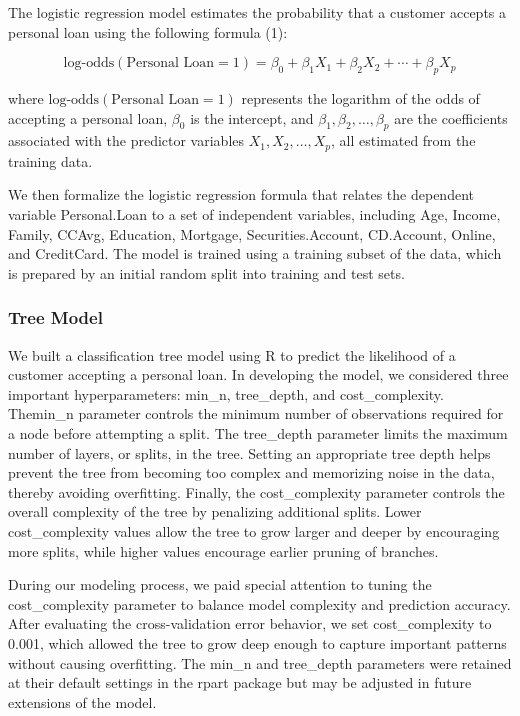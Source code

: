 \documentclass[12pt]{article}
\begin{document}
The logistic regression model estimates the probability that a customer accepts a personal loan using the following formula (1):

\begin{equation}
\text{log-odds}(\text{Personal Loan} = 1) = \beta_0 + \beta_1 X_1 + \beta_2 X_2 + \cdots + \beta_p X_p
\end{equation}

where $\text{log-odds}(\text{Personal Loan} = 1)$ represents the logarithm of the odds of accepting a personal loan, $\beta_0$ is the intercept, and $\beta_1, \beta_2, \dots, \beta_p$ are the coefficients associated with the predictor variables $X_1, X_2, \dots, X_p$, all estimated from the training data.

We then formalize the logistic regression formula that relates the dependent variable Personal.Loan to a set of independent variables, including Age, Income, Family, CCAvg, Education, Mortgage, Securities.Account, CD.Account, Online, and CreditCard. The model is trained using a training subset of the data, which is prepared by an initial random split into training and test sets.

\subsubsection{Tree Model}
We built a classification tree model using \textsf{R} to predict the likelihood of a customer accepting a personal loan. In developing the model, we considered three important hyperparameters: min\_n, tree\_depth, and cost\_complexity. Themin\_n parameter controls the minimum number of observations required for a node before attempting a split. The tree\_depth parameter limits the maximum number of layers, or splits, in the tree. Setting an appropriate tree depth helps prevent the tree from becoming too complex and memorizing noise in the data, thereby avoiding overfitting. Finally, the cost\_complexity parameter controls the overall complexity of the tree by penalizing additional splits. Lower cost\_complexity values allow the tree to grow larger and deeper by encouraging more splits, while higher values encourage earlier pruning of branches.

During our modeling process, we paid special attention to tuning the cost\_complexity parameter to balance model complexity and prediction accuracy. After evaluating the cross-validation error behavior, we set cost\_complexity to 0.001, which allowed the tree to grow deep enough to capture important patterns without causing overfitting. The min\_n and tree\_depth parameters were retained at their default settings in the rpart package but may be adjusted in future extensions of the model.
\end{document}
